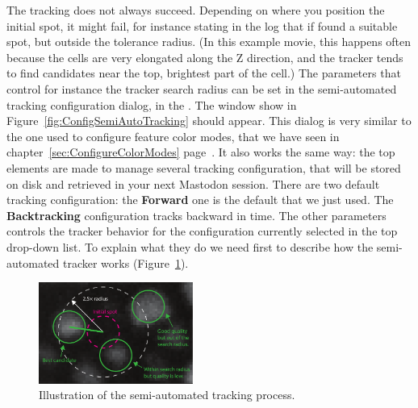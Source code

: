 The tracking does not always succeed. 
Depending on where you position the initial spot, it might fail, for instance stating in the log that if found a suitable spot, but outside the tolerance radius.
(In this example movie, this happens often because the cells are very elongated along the Z direction, and the tracker tends to find candidates near the top, brightest part of the cell.) 
The parameters that control for instance the tracker search radius can be set in the semi-automated tracking configuration dialog, in the .
The window show in Figure~\ref{fig:ConfigSemiAutoTracking} should appear.
This dialog is very similar to the one used to configure feature color modes, that we have seen in chapter~\ref{sec:ConfigureColorModes} page~\pageref{sec:ConfigureColorModes}.
It also works the same way: the top elements are made to manage several tracking configuration, that will be stored on disk and retrieved in your next Mastodon session. 
There are two default tracking configuration: the \textbf{Forward} one is the default that we just used. 
The \textbf{Backtracking} configuration tracks backward in time. 
The other parameters controls the tracker behavior for the configuration currently selected in the top drop-down list.
To explain what they do we need first to describe how the semi-automated tracker works (Figure~\ref{fig:ExplainSemiAutoTracking}).

\begin{figure}
    \centering
    \includegraphics[width=0.45\textwidth]{figures/Mastodon_ExplainSemiAutoTracker_copie.pdf}
    \caption{Illustration of the semi-automated tracking process.}
    \label{fig:ExplainSemiAutoTracking}
\end{figure}

